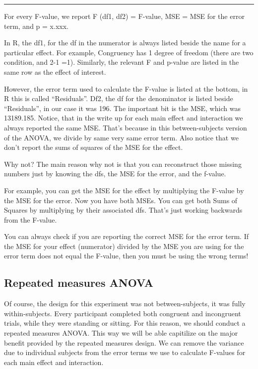 \documentclass[
]{book}
\begin{document}
\begin{center}\rule{0.5\linewidth}{0.5pt}\end{center}

For every F-value, we report F (df1, df2) = F-value, MSE = MSE for the error term, and p = x.xxx.

In R, the df1, for the df in the numerator is always listed beside the name for a particular effect. For example, Congruency has 1 degree of freedom (there are two condition, and 2-1 =1). Similarly, the relevant F and p-value are listed in the same row as the effect of interest.

However, the error term used to calculate the F-value is listed at the bottom, in R this is called ``Residuals''. Df2, the df for the denominator is listed beside ``Residuals'', in our case it was 196. The important bit is the MSE, which was 13189.185. Notice, that in the write up for each main effect and interaction we always reported the same MSE. That's because in this between-subjects version of the ANOVA, we divide by same very same error term. Also notice that we don't report the sums of squares of the MSE for the effect.

Why not? The main reason why not is that you can reconstruct those missing numbers just by knowing the dfs, the MSE for the error, and the f-value.

For example, you can get the MSE for the effect by multiplying the F-value by the MSE for the error. Now you have both MSEs. You can get both Sums of Squares by multiplying by their associated dfs. That's just working backwards from the F-value.

You can always check if you are reporting the correct MSE for the error term. If the MSE for your effect (numerator) divided by the MSE you are using for the error term does not equal the F-value, then you must be using the wrong terms!

\hypertarget{repeated-measures-anova}{%
\subsection{Repeated measures ANOVA}\label{repeated-measures-anova}}

Of course, the design for this experiment was not between-subjects, it was fully within-subjects. Every participant completed both congruent and incongruent trials, while they were standing or sitting. For this reason, we should conduct a repeated measures ANOVA. This way we will be able capitilize on the major benefit provided by the repeated measures design. We can remove the variance due to individual subjects from the error terms we use to calculate F-values for each main effect and interaction.
\end{document}
